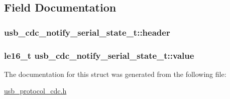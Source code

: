 \subsection{\-Field \-Documentation}
\hypertarget{structusb__cdc__notify__serial__state__t_aca542b1ab1aa7c5dc0d72bd31baf2d03}{
\subsubsection[{header}]{ {\bf usb\-\_\-cdc\-\_\-notify\-\_\-serial\-\_\-state\-\_\-t\-::header}}}
\label{structusb__cdc__notify__serial__state__t_aca542b1ab1aa7c5dc0d72bd31baf2d03}
\hypertarget{structusb__cdc__notify__serial__state__t_a4183db1e7c5174bce0453504b6e91463}{
\subsubsection[{value}]{\setlength{\rightskip}{0pt plus 5cm}le16\-\_\-t {\bf usb\-\_\-cdc\-\_\-notify\-\_\-serial\-\_\-state\-\_\-t\-::value}}}
\label{structusb__cdc__notify__serial__state__t_a4183db1e7c5174bce0453504b6e91463}


\-The documentation for this struct was generated from the following file\-:\begin{DoxyCompactItemize}
\item 
\hyperlink{usb__protocol__cdc_8h}{usb\-\_\-protocol\-\_\-cdc.\-h}\end{DoxyCompactItemize}
